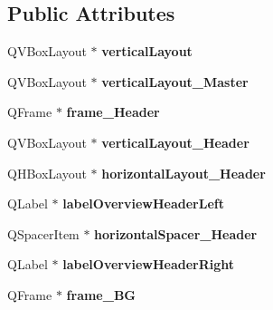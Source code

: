 \subsection*{Public Attributes}
\begin{DoxyCompactItemize}
\item 
\mbox{\label{class_ui___send_coins_dialog_a6baa200e2a974de73bbe0947d0a70900}} 
Q\+V\+Box\+Layout $\ast$ {\bfseries vertical\+Layout}
\item 
\mbox{\label{class_ui___send_coins_dialog_a33a68e76a695b926f9115c16061fb5f0}} 
Q\+V\+Box\+Layout $\ast$ {\bfseries vertical\+Layout\+\_\+\+Master}
\item 
\mbox{\label{class_ui___send_coins_dialog_af3e32de39f6e43e0d917443bcac23a53}} 
Q\+Frame $\ast$ {\bfseries frame\+\_\+\+Header}
\item 
\mbox{\label{class_ui___send_coins_dialog_a5464cdfbd75277bac9a81a23ae333e6e}} 
Q\+V\+Box\+Layout $\ast$ {\bfseries vertical\+Layout\+\_\+\+Header}
\item 
\mbox{\label{class_ui___send_coins_dialog_a08da822c57ece038bc7ba5ad2e724fe9}} 
Q\+H\+Box\+Layout $\ast$ {\bfseries horizontal\+Layout\+\_\+\+Header}
\item 
\mbox{\label{class_ui___send_coins_dialog_a2c2a26dca03bb34a0a790bf218078eb5}} 
Q\+Label $\ast$ {\bfseries label\+Overview\+Header\+Left}
\item 
\mbox{\label{class_ui___send_coins_dialog_a162ae3e39990f46e3346536fd6e29408}} 
Q\+Spacer\+Item $\ast$ {\bfseries horizontal\+Spacer\+\_\+\+Header}
\item 
\mbox{\label{class_ui___send_coins_dialog_a646c07b2fac97898953a666ef20c9b20}} 
Q\+Label $\ast$ {\bfseries label\+Overview\+Header\+Right}
\item 
\mbox{\label{class_ui___send_coins_dialog_ae912ae52d1970f4f219ffe19198253d0}} 
Q\+Frame $\ast$ {\bfseries frame\+\_\+\+BG}

\end{DoxyCompactItemize}
